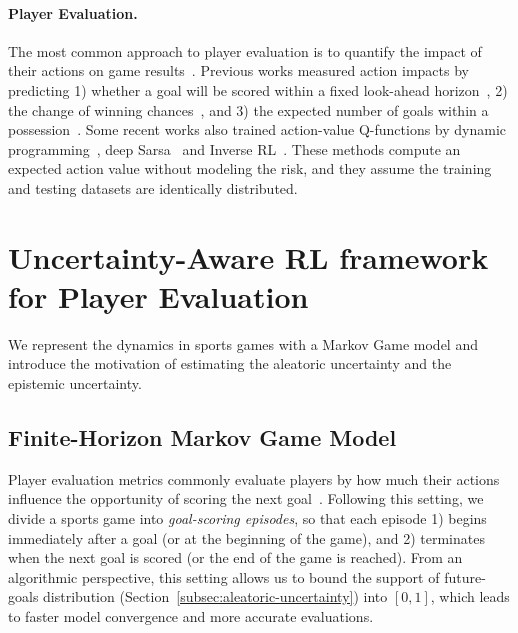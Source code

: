 \documentclass[letterpaper]{article} %
\begin{document}
\paragraph{Player Evaluation.} 
The most common approach to player evaluation is to quantify the impact of their actions on game results~\cite{schwartz2017handbook}. Previous works measured action impacts by predicting 1) whether a goal will be scored within a fixed look-ahead horizon~\cite{Decroos2019Actions}, 2) the change of winning chances~\cite{Xenopoulos2020CounterStrike}, and 3) the expected number of goals within a possession~\cite{cervone2016multiresolution}.  
Some recent works also trained action-value Q-functions by dynamic programming~\cite{Routley2015Markov}, deep Sarsa~\cite{Liu2018DRL,Liu2020soccer} and Inverse RL~\cite{Luo2020IRL}. These methods compute an expected action value without modeling the risk, and they assume the training and testing datasets are identically distributed. 

\section{Uncertainty-Aware RL framework \\for Player Evaluation}
We represent the dynamics in sports games with a Markov Game model and  introduce the motivation of estimating the aleatoric uncertainty and the epistemic uncertainty.

\subsection{Finite-Horizon Markov Game Model}
Player evaluation metrics commonly evaluate players by how much their actions influence the opportunity of scoring the next goal~\cite{Liu2018DRL,Decroos2019Actions,Sun2020Cracking}. Following this setting,  we divide a sports game into {\it goal-scoring episodes}, so that each episode 1) begins immediately after a goal (or at the beginning of the game), and 2) terminates when the next goal is scored (or the end of the game is reached). From an algorithmic perspective, this setting allows us to bound the support of future-goals distribution (Section~\ref{subsec:aleatoric-uncertainty}) into $[0,1]$,
which leads to faster model convergence and more accurate evaluations. 
\end{document}
